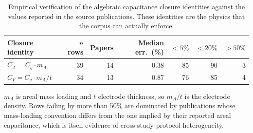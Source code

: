\begin{table}[htbp]
\centering
\caption{Empirical verification of the algebraic capacitance closure identities against the values reported in the source publications. These identities are the physics that the corpus can actually enforce.}
\label{tab:closure}
\footnotesize
\begin{tabular}{lrrrrrr}
\toprule
\textbf{Closure identity} & \textbf{$n$ rows} & \textbf{Papers} & \textbf{Median err.\ (\%)} & \textbf{$<5\%$} & \textbf{$<20\%$} & \textbf{$>50\%$} \\
\midrule
$C_A = C_g \cdot m_A$ & 39 & 14 & 0.38 & 85 & 90 & 3 \\
$C_V = C_g \cdot m_A /t$ & 34 & 13 & 0.87 & 76 & 85 & 4 \\
\bottomrule
\end{tabular}
\par\vspace{2pt}\begin{minipage}{\linewidth}\scriptsize $m_A$ is areal mass loading and $t$ electrode thickness, so $m_A/t$ is the electrode density. Rows failing by more than 50\% are dominated by publications whose mass-loading convention differs from the one implied by their reported areal capacitance, which is itself evidence of cross-study protocol heterogeneity.\end{minipage}
\end{table}